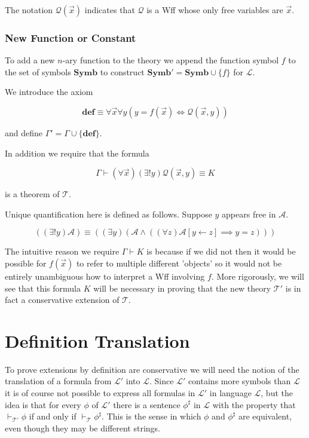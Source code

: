 \documentclass[12pt]{article}
\newcommand{\bv}[1]{\boldsymbol{#1}}
\newcommand{\mc}[1]{\mathcal{#1}}
\newcommand{\bc}[1]{\bv{\mc{#1}}}
\begin{document}
The notation $\mc{Q}(\vec{x})$ indicates that $\mc{Q}$ is a Wff whose only free variables are $\vec{x}$.

\subsubsection*{New Function or Constant}

 To add a new $n$-ary function to the theory we append the function symbol $f$ to the set of symbols $\textbf{Symb}$ to construct $\textbf{Symb}' = \textbf{Symb}\cup\{f\}$ for $\bv{\mc{L}}$.

We introduce the axiom

\begin{equation}
\textbf{def} \equiv \forall \vec{x} \forall y(y=f(\vec{x})\iff \mc{Q}(\vec{x},y))
\end{equation}

and define $\Gamma' = \Gamma \cup \{\textbf{def}\}$.

In addition we require that the formula

\begin{equation}
\Gamma \vdash (\forall \vec{x})(\exists! y) \mc{Q}(\vec{x},y) \equiv K
\end{equation}

is a theorem of $\bc{T}$.

Unique quantification here is defined as follows. Suppose $y$ appears free in $\mc{A}$.

\begin{equation}
((\exists!y)\mc{A}) \equiv ((\exists y)(\mc{A} \land ((\forall z)\mc{A}[y\leftarrow z] \implies y=z)))
\end{equation}

The intuitive reason we require $\Gamma \vdash K$ is because if we did not then it would be possible for $f(\vec{x})$ to refer to multiple different 'objects' so it would not be entirely unambiguous how to interpret a Wff involving $f$. More rigorously, we will see that this formula $K$ will be necessary in proving that the new theory $\bc{T}'$ is in fact a conservative extension of $\bc{T}$.

\section{Definition Translation}

To prove extensions by definition are conservative we will need the notion of the translation of a formula from $\bv{\mc{L}}'$ into $\bv{\mc{L}}$. Since $\bv{\mc{L}}'$ contains more symbols than $\bv{\mc{L}}$ it is of course not possible to express all formulas in $\bv{\mc{L}}'$ in language $\bv{\mc{L}}$, but the idea is that for every $\phi$ of $\bv{\mc{L}}'$ there is a sentence $\phi^\sharp$ in $\bv{\mc{L}}$ with the property that $\vdash_{\bc{T}'}\phi$ if and only if $\vdash_{\bc{T}}\phi^{\sharp}$. This is the sense in which $\phi$ and $\phi^{\sharp}$ are equivalent, even though they may be different strings.
\end{document}
